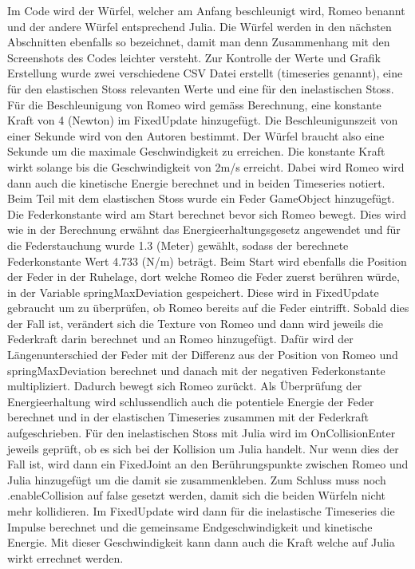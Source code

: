 \documentclass[../main.tex]{subfiles}
\begin{document}
Im Code wird der Würfel, welcher am Anfang beschleunigt wird, Romeo benannt und der andere Würfel entsprechend
Julia. Die Würfel werden in den nächsten Abschnitten ebenfalls so bezeichnet, damit man denn Zusammenhang mit den
Screenshots des Codes leichter versteht. Zur Kontrolle der Werte und Grafik Erstellung wurde zwei verschiedene
CSV Datei erstellt (timeseries genannt), eine für den elastischen Stoss relevanten Werte und eine für den inelastischen Stoss.
\newline
Für die Beschleunigung von Romeo wird gemäss Berechnung, eine konstante Kraft von 4 (Newton) im FixedUpdate hinzugefügt.
Die Beschleunigunszeit von einer Sekunde wird von den Autoren bestimmt.
Der Würfel braucht also eine Sekunde um die maximale Geschwindigkeit zu erreichen.
Die konstante Kraft wirkt solange bis die Geschwindigkeit von 2m/s erreicht.
Dabei wird Romeo wird dann auch die kinetische Energie berechnet und in beiden Timeseries notiert.
\newline
Beim Teil mit dem elastischen Stoss wurde ein Feder GameObject hinzugefügt. Die Federkonstante wird am Start berechnet
bevor sich Romeo bewegt. Dies wird wie in der Berechnung erwähnt das Energieerhaltungsgesetz angewendet und für die
Federstauchung wurde 1.3 (Meter) gewählt, sodass der berechnete Federkonstante Wert 4.733 (N/m) beträgt. Beim Start
wird ebenfalls die Position der Feder in der Ruhelage, dort welche Romeo die Feder zuerst berühren würde, in der
Variable springMaxDeviation gespeichert.
\newline
Diese wird in FixedUpdate gebraucht um zu überprüfen, ob Romeo bereits auf die Feder eintrifft.
Sobald dies der Fall ist, verändert sich die Texture von Romeo und dann wird jeweils die Federkraft darin
berechnet und an Romeo hinzugefügt. Dafür wird der Längenunterschied der Feder mit der Differenz aus der
Position von Romeo und springMaxDeviation berechnet und danach mit der negativen Federkonstante multipliziert.
Dadurch bewegt sich Romeo  zurückt. Als Überprüfung der Energieerhaltung wird schlussendlich auch die potentiele
Energie der Feder berechnet und in der elastischen Timeseries zusammen mit der Federkraft aufgeschrieben.
\newline
Für den inelastischen Stoss mit Julia wird im OnCollisionEnter jeweils geprüft, ob es sich bei der Kollision um
Julia handelt. Nur wenn dies der Fall ist, wird dann ein FixedJoint an den Berührungspunkte zwischen Romeo und
Julia hinzugefügt um die damit sie zusammenkleben. Zum Schluss muss noch .enableCollision auf false gesetzt werden,
damit sich die beiden Würfeln nicht mehr kollidieren.
\newline
Im FixedUpdate wird dann für die inelastische Timeseries die Impulse berechnet und die gemeinsame Endgeschwindigkeit
und kinetische Energie. Mit dieser Geschwindigkeit kann dann auch die Kraft welche auf Julia wirkt errechnet werden.
\end{document}
